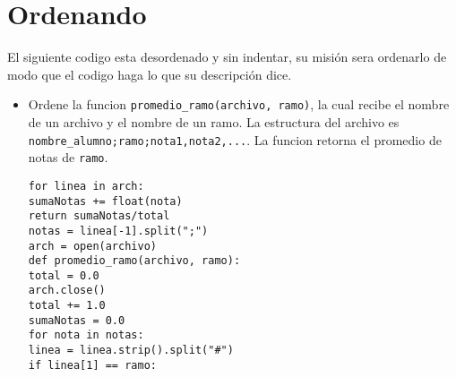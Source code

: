 \section{Ordenando}

El siguiente codigo esta desordenado y sin indentar, su misión sera ordenarlo de modo que el codigo haga lo que su descripción dice.

\begin{itemize}

\item Ordene la funcion \texttt{promedio\_ramo(archivo, ramo)}, la cual recibe el nombre de un archivo y el nombre de un ramo. La estructura del archivo es \texttt{nombre\_alumno;ramo;nota1,nota2,...}. La funcion retorna el promedio de notas de \texttt{ramo}.

\begin{lstlisting}[style=consola]
for linea in arch:
sumaNotas += float(nota)
return sumaNotas/total
notas = linea[-1].split(";")
arch = open(archivo)
def promedio_ramo(archivo, ramo):
total = 0.0
arch.close()
total += 1.0
sumaNotas = 0.0
for nota in notas:
linea = linea.strip().split("#")
if linea[1] == ramo:
\end{lstlisting}

\end{itemize}
